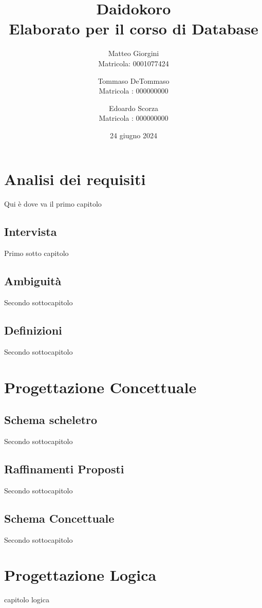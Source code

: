 ﻿\documentclass[a4paper,12pt]{report}
\title{Daidokoro \\ Elaborato per il corso di Database}
\author
{
    Matteo Giorgini \\ Matricola: 0001077424 \\
    \and
    Tommaso DeTommaso \\ Matricola : 000000000 \\
    \and 
    Edoardo Scorza \\ Matricola : 000000000 \\
}
\date{24 giugno 2024}
\begin{document}
\maketitle
\tableofcontents

\chapter*{Analisi dei requisiti}
Qui è dove va il primo capitolo
\section*{Intervista}
Primo sotto capitolo
\section*{Ambiguità}
Secondo sottocapitolo
\section*{Definizioni}
Secondo sottocapitolo


\chapter*{Progettazione Concettuale}
\section*{Schema scheletro}
Secondo sottocapitolo
\section*{Raffinamenti Proposti}
Secondo sottocapitolo
\section*{Schema Concettuale}
Secondo sottocapitolo


\chapter*{Progettazione Logica}
capitolo logica
\end{document}
